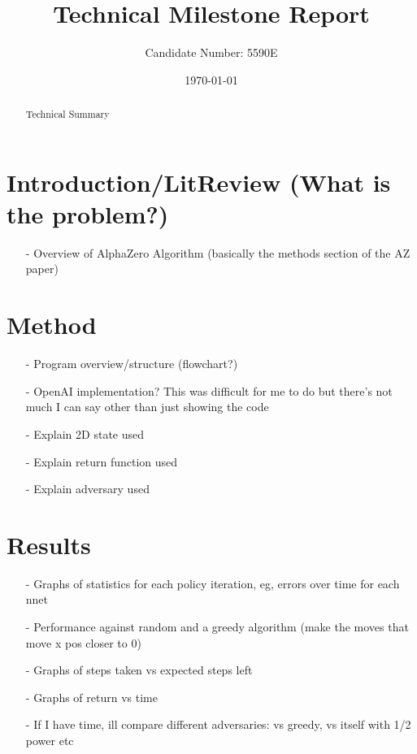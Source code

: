 \documentclass[a4paper]{article}
\author{Candidate Number: 5590E}
\title{Technical Milestone Report}
\date{\today}
\begin{document}
%

\maketitle

\renewcommand{\abstractname}{Summary}
\begin{abstract}
Technical Summary
\end{abstract}


\section{Introduction/LitReview (What is the problem?)}
 
\begin{itemize}
   \item[-] Overview of AlphaZero Algorithm (basically the methods section of the AZ paper)
\end{itemize}

\section{Method}
\begin{itemize}
   \item[-] Program overview/structure (flowchart?)
   \item[-] OpenAI implementation? This was difficult for me to do but there's not much I can say other than just showing the code
   \item[-] Explain 2D state used
   \item[-] Explain return function used
   \item[-] Explain adversary used
\end{itemize}

\section{Results}
\begin{itemize}
   \item[-] Graphs of statistics for each policy iteration, eg, errors over time for each nnet
   \item[-] Performance against random and a greedy algorithm (make the moves that move x pos closer to 0)
   \item[-] Graphs of steps taken vs expected steps left
   \item[-] Graphs of return vs time
   \item[-] If I have time, ill compare different adversaries: vs greedy, vs itself with 1/2 power etc
\end{itemize}  
\end{document}
